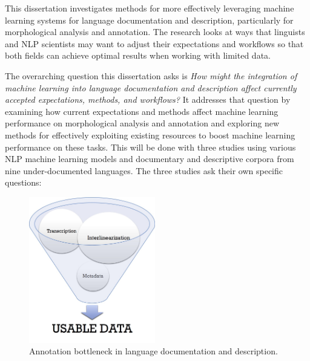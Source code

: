 This dissertation investigates methods for more effectively leveraging machine learning systems for language documentation and description, particularly for morphological analysis and annotation. The research looks at ways that linguists and NLP scientists may want to adjust their expectations and workflows so that both fields can achieve optimal results when working with limited data. 


The overarching question this dissertation asks is \emph{How might the integration of machine learning into language documentation and description affect currently accepted expectations, methods, and workflows?} It addresses that question by examining how current expectations and methods affect machine learning performance on morphological analysis and annotation and exploring new methods for effectively exploiting existing resources to boost machine learning performance on these tasks. This will be done with three studies using various NLP machine learning models and documentary and descriptive corpora from nine under-documented languages. The three studies ask their own specific questions:

\begin{figure}[t]
    \centering
    \includegraphics[width=5.5cm]{figs/AnnotationFunnel.jpg}
    \caption[Annotation Bottleneck]{Annotation bottleneck in language documentation and description.}
    \label{fig:bottleneck}
\end{figure}


